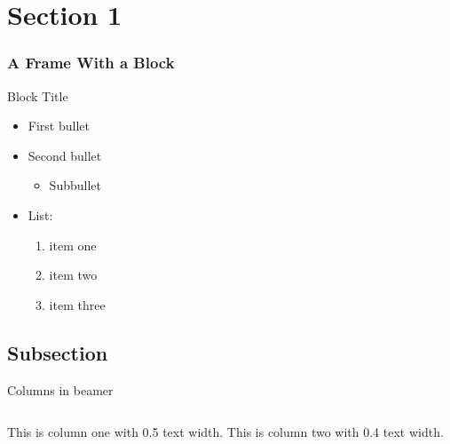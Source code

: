 \documentclass[aspectratio=1610]{beamer}
\begin{document}
\section{Section 1}
\begin{frame}
  \frametitle{A Frame With a Block}
  \begin{block}{Block Title}
  \begin{itemize}
  \item First bullet
  \item Second bullet
    \begin{itemize}
    \item Subbullet
    \end{itemize}
  \item List:
    \begin{enumerate}
    \item item one
    \item item two
    \item item three
    \end{enumerate}
  \end{itemize}
  \end{block}
\end{frame}



\subsection{Subsection}
\begin{frame}{Columns in beamer}
    \begin{columns}
        \centering
        This is column one with 0.5 text width.
        \centering
        This is column two with 0.4 text width.
    \end{columns}
\end{frame}
\end{document}
